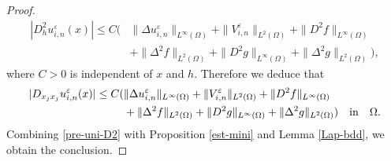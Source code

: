 \documentclass[12pt]{amsart}
\begin{document}
\begin{proof}
\begin{align*}
| D^{2}_{h} u^{\varepsilon}_{i,n} (x) | 
\le C ( & \| \Delta u^{\varepsilon}_{i,n} \|_{L^{\infty}(\Omega)} + \| V^{\varepsilon}_{i,n} \|_{L^{2}(\Omega)} + \| D^{2} f \|_{L^{\infty}(\Omega)}\\ 
  &  + \| \Delta^{2} f \|_{L^{2}(\Omega)} + \| D^{2} g \|_{L^{\infty}(\Omega)} + \| \Delta^{2} g \|_{L^{2}(\Omega)}),  
\end{align*} 
where $C>0$ is independent of $x$ and $h$. 
Therefore we deduce that 
\begin{align} \label{pre-uni-D2}
| D_{x_{j} x_{j}} u^{\varepsilon}_{i,n} (x) | 
\le C ( & \| \Delta u^{\varepsilon}_{i,n} \|_{L^{\infty}(\Omega)} + \| V^{\varepsilon}_{i,n} \|_{L^{2}(\Omega)} + \| D^{2} f \|_{L^{\infty}(\Omega)}\\ 
  &  + \| \Delta^{2} f \|_{L^{2}(\Omega)} + \| D^{2} g \|_{L^{\infty}(\Omega)} + \| \Delta^{2} g \|_{L^{2}(\Omega)}) 
  \quad \text{in} \quad \Omega.  \notag
\end{align} 
Combining \eqref{pre-uni-D2} with Proposition \ref{est-mini} and Lemma \ref{Lap-bdd}, we obtain the conclusion. 
\end{proof}
\end{document}
